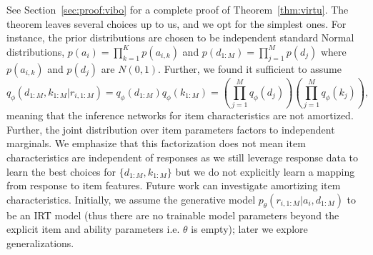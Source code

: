 See Section~\ref{sec:proof:vibo} for a complete proof of Theorem~\ref{thm:virtu}.
The theorem leaves several choices up to us, and we opt for the simplest ones.
For instance, the prior distributions are chosen to be independent standard Normal distributions, $p(a_i) = \prod_{k=1}^K p(a_{i,k})$ and $p(d_{1:M}) = \prod_{j=1}^M p(d_{j})$ where $p(a_{i,k})$ and $p(d_j)$ are $N(0,1)$.
Further, we found it sufficient to assume 
\begin{equation}
    q_\phi(d_{1:M},k_{1:M}|r_{i,1:M}) = q_\phi(d_{1:M})q_\phi(k_{1:M})= \left(\prod_{j=1}^M q_\phi(d_{j})\right)\left(\prod_{j=1}^M q_\phi(k_{j})\right),
\end{equation}
meaning that the inference networks for item characteristics are not amortized. Further, the joint distribution over item parameters factors to independent marginals.
We emphasize that this factorization does not mean item characteristics are independent of responses as we still leverage response data to learn the best choices for $\{d_{1:M},k_{1:M}\}$ but we do not explicitly learn a mapping from response to item features. 
Future work can investigate amortizing item characteristics.
Initially, we assume the generative model $p_\theta(r_{i,1:M}|a_i,d_{1:M})$ to be an IRT model (thus there are no trainable model parameters beyond the explicit item and ability parameters i.e. $\theta$ is empty); later we explore generalizations.


